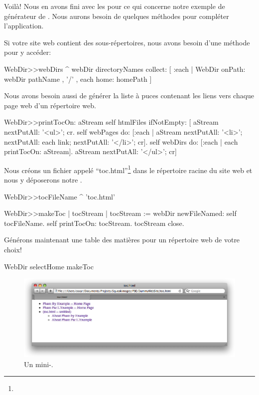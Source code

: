 \documentclass[a4paper,10pt,twoside]{book}
\begin{document}
Voilà! Nous en avons fini avec les \expregs pour ce qui concerne notre
exemple de générateur de \sitemap.
Nous aurons besoin de quelques méthodes pour compléter l'application.


Si votre site web contient des sous-répertoires, nous avons besoin
d'une méthode pour y accéder:
\begin{code}{}
WebDir>>webDirs
	^ webDir directoryNames
		collect: [ :each | WebDir onPath: webDir pathName , '/' , each home: homePath ]
\end{code}

Nous avons besoin aussi de générer la liste à puces contenant les
liens vers chaque page web d'un répertoire web.
\begin{code}{}
WebDir>>printTocOn: aStream 
	self htmlFiles
		ifNotEmpty: [
			aStream nextPutAll: '<ul>'; cr.
			self webPages
				do: [:each | aStream nextPutAll: '<li>';
						 nextPutAll: each link;
						 nextPutAll: '</li>'; cr].
			self webDirs
				do: [:each | each printTocOn: aStream].
			aStream nextPutAll: '</ul>'; cr]
\end{code}

Nous créons un fichier appelé ``toc.html''\footnote{}
dans le répertoire racine du site web et nous y déposerons notre
\sitemap.
\begin{code}{}
WebDir>>tocFileName
	^ 'toc.html'

WebDir>>makeToc
	| tocStream |
	tocStream := webDir newFileNamed: self tocFileName.
	self printTocOn: tocStream.
	tocStream close.
\end{code}

Générons maintenant une table des matières pour un répertoire web de
votre choix!
\begin{code}{}
WebDir selectHome makeToc
\end{code}

\begin{figure}[tbh]
\begin{center}
\includegraphics[width=\textwidth]{PBE-toc}
\caption{Un mini-\sitemap.}
\end{center}
\end{figure}
\end{document}
